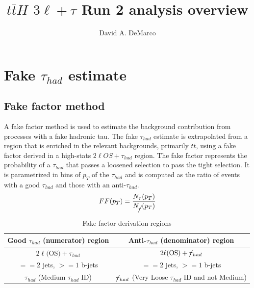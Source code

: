 \documentclass[11pt]{article}
\author{David A. DeMarco}
\title{$t\bar{t}H$ $3\ell+\tau$ Run 2 analysis overview}
\begin{document}
	\maketitle
	\begin{center}
	\end{center}	 
	\clearpage 
	

	
	\section{Fake $\tau_{had}$ estimate} 
	\subsection{Fake factor method} 
	A fake factor method is used to estimate the background contribution from processes with a fake hadronic tau. The fake $\tau_{had}$ estimate is extrapolated from a region that is enriched in the relevant backgrounds, primarily $t\bar{t}$, using a fake factor derived in a high-stats $2\ell OS+\tau_{had}$ region. The fake factor represents the probability of a $\tau_{had}$ that passes a loosened selection to pass the tight selection. It is parametrized in bins of $p_T$ of the $\tau_{had}$ and is computed as the ratio of events with a good $\tau_{had}$ and those with an anti-$\tau_{had}$. \\
	
	\begin{equation}
		FF(p_T) = \frac{N_\tau (p_T)}{N_{\cancel{\tau}} (p_T)  }   
	\end{equation}

	\begin{table}[htp]
		\caption{Fake factor derivation regions} 
		\begin{center}
			\begin{tabular}{|c|c|}
			\hline
			Good $\tau_{had}$ (numerator) region		& Anti-$\tau_{had}$ (denominator) region	\\
			\hline
			$2\ell \text{(OS)}+\tau_{had}$ 			& $2\ell \text{(OS)}+\cancel{\tau}_{had}$\\
			$==2$ jets, $>=1$ b-jets				& $==2$ jets, $>=1$ b-jets\\
			$\tau_{had}$ (Medium $\tau_{had}$ ID) 	& $\cancel{\tau}_{had}$ (Very Loose $\tau_{had}$ ID and not Medium) \\
			\hline
			\end{tabular}
		\end{center}
	\end{table}%
\end{document}
